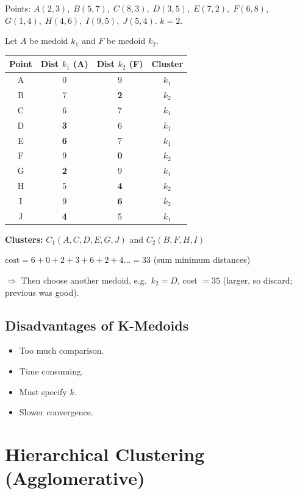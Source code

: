 \documentclass[12pt,a4paper]{article}
\begin{document}
\begin{examplebox}
Points: $A(2,3),\; B(5,7),\; C(8,3),\; D(3,5),\; E(7,2),\; F(6,8)$,\\
$G(1,4),\; H(4,6),\; I(9,5),\; J(5,4)$. $k = 2$.

Let $A$ be medoid $k_1$ and $F$ be medoid $k_2$.

\begin{center}
\begin{tabular}{cccc}
\toprule
Point & Dist $k_1$ (A) & Dist $k_2$ (F) & Cluster \\
\midrule
A & 0 & 9  & $k_1$ \\
B & 7 & \textbf{2}  & $k_2$ \\
C & 6 & 7  & $k_1$ \\
D & \textbf{3} & 6  & $k_1$ \\
E & \textbf{6} & 7  & $k_1$ \\
F & 9 & \textbf{0}  & $k_2$ \\
G & \textbf{2} & 9  & $k_1$ \\
H & 5 & \textbf{4}  & $k_2$ \\
I & 9 & \textbf{6}  & $k_2$ \\
J & \textbf{4} & 5  & $k_1$ \\
\bottomrule
\end{tabular}
\end{center}

\textbf{Clusters:} $C_1(A,C,D,E,G,J)$ and $C_2(B,F,H,I)$

$\text{cost} = 6 + 0 + 2 + 3 + 6 + 2 + 4 \ldots = 33$ (sum minimum distances)

$\Rightarrow$ Then choose another medoid, e.g.\ $k_2 = D$, cost $= 35$ (larger, so discard; previous was good).
\end{examplebox}

\subsection{Disadvantages of K-Medoids}
\begin{itemize}
  \item Too much comparison.
  \item Time consuming.
  \item Must specify $k$.
  \item Slower convergence.
\end{itemize}

\section{Hierarchical Clustering (Agglomerative)}
\end{document}
